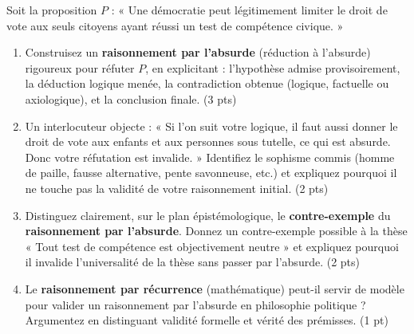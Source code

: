 \documentclass[11pt]{article}
\begin{document}
\begin{exercice}
Soit la proposition $P$ : « Une démocratie peut légitimement limiter le droit de vote aux seuls citoyens ayant réussi un test de compétence civique. »
\begin{enumerate}
    \item Construisez un \textbf{raisonnement par l'absurde} (réduction à l'absurde) rigoureux pour réfuter $P$, en explicitant : l'hypothèse admise provisoirement, la déduction logique menée, la contradiction obtenue (logique, factuelle ou axiologique), et la conclusion finale. (3 pts)
    \item Un interlocuteur objecte : « Si l'on suit votre logique, il faut aussi donner le droit de vote aux enfants et aux personnes sous tutelle, ce qui est absurde. Donc votre réfutation est invalide. » Identifiez le sophisme commis (homme de paille, fausse alternative, pente savonneuse, etc.) et expliquez pourquoi il ne touche pas la validité de votre raisonnement initial. (2 pts)
    \item Distinguez clairement, sur le plan épistémologique, le \textbf{contre-exemple} du \textbf{raisonnement par l'absurde}. Donnez un contre-exemple possible à la thèse « Tout test de compétence est objectivement neutre » et expliquez pourquoi il invalide l'universalité de la thèse sans passer par l'absurde. (2 pts)
    \item Le \textbf{raisonnement par récurrence} (mathématique) peut-il servir de modèle pour valider un raisonnement par l'absurde en philosophie politique ? Argumentez en distinguant validité formelle et vérité des prémisses. (1 pt)
\end{enumerate}
\end{exercice}
\end{document}
